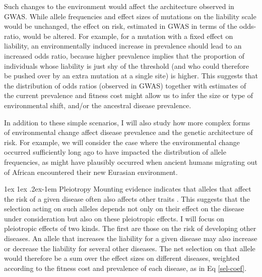 \message{ !name(ResearchStrategy.tex)}\documentclass[11pt]{article}
\makeatletter
\renewcommand{\paragraph}{%
  \@startsection{paragraph}{4}%
  {\z@}{1ex \@plus 1ex \@minus .2ex}{-1em}%
  {\normalfont\normalsize\bfseries}%
}
\makeatother
\begin{document}
Such changes to the environment would affect the architecture observed in GWAS. While allele frequencies and effect sizes of mutations on the liability scale would be unchanged, the effect on risk, estimated in GWAS in terms of the odds-ratio, would be altered. For example, for a mutation with a fixed effect on liability, an environmentally induced increase in prevalence should lead to an increased odds ratio, because higher prevalence implies that the proportion of individuals whose liability is just shy of the threshold (and who could therefore be pushed over by an extra mutation at a single site) is higher. This suggests that the distribution of odds ratios (observed in GWAS) together with estimates of the current prevalence and fitness cost might allow us to infer the size or type of environmental shift, and/or the ancestral disease prevalence. 

In addition to these simple scenarios, I will also study how more complex forms of environmental change affect disease prevalence and the genetic architecture of risk. For example, we will consider the case where the environmental change occurred sufficiently long ago to have impacted the distribution of allele frequencies, as might have plausibly occurred when ancient humans migrating out of African encountered their new Eurasian environment. 



\paragraph{Pleiotropy}
Mounting evidence indicates that alleles that affect the risk of a given disease often also affects other traits \cite{BulikSullivan:2015jf,Pickrell:2016ko, Visscher:2016fp}. This suggests that the selection acting on such alleles depends not only on their effect on the disease under consideration but also on these pleiotropic effects. I will focus on pleiotropic effects of two kinds. The first are those on the risk of developing other diseases. An allele that increases the liability for a given disease may also increase or decrease the liability for several other diseases. The net selection on that allele would therefore be a sum over the effect sizes on different diseases, weighted according to the fitness cost and prevalence of each disease, as in Eq \eqref{sel-coef}. 
\end{document}
